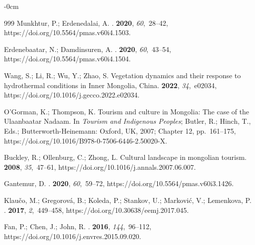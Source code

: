 \documentclass[geosciences,article,accept,pdftex,oneauthor]{Definitions/mdpi}
\begin{document}
\begin{adjustwidth}{-\extralength}{0cm}
\begin{thebibliography}{999}
Munkhtur, P.; Erdenedalai, A.
.
 {\bf 2020},
  {\em 60},~28--42, https://doi.org/10.5564/pmas.v60i4.1503.

Erdenebaatar, N.; Damdinsuren, A.
.
 {\bf 2020},
  {\em 60},~43--54, https://doi.org/10.5564/pmas.v60i4.1504.

Wang, S.; Li, R.; Wu, Y.; Zhao, S.
\newblock Vegetation dynamics and their response to hydrothermal conditions in
  Inner Mongolia, China.
 {\bf 2022}, {\em 34},~e02034, https://doi.org/10.1016/j.gecco.2022.e02034.

O'Gorman, K.; Thompson, K.
\newblock Tourism and culture in Mongolia: The case of the
  Ulaanbaatar Nadaam. In {\em Tourism and Indigenous Peoples}; Butler, R.;
  Hinch, T., Eds.; Butterworth-Heinemann: Oxford, UK, 2007; Chapter 12, pp.~161--175, https://doi.org/10.1016/B978-0-7506-6446-2.50020-X.

Buckley, R.; Ollenburg, C.; Zhong, L.
\newblock Cultural landscape in mongolian tourism.
 {\bf 2008}, {\em 35},~47--61, https://doi.org/10.1016/j.annals.2007.06.007.

Gantemur, D.
.
 {\bf 2020},
  {\em 60},~59--72, https://doi.org/10.5564/pmas.v60i3.1426.

Klaučo, M.; Gregorová, B.; Koleda, P.; Stankov, U.; Marković, V.; Lemenkova,
  P.
.
 {\bf 2017},
  {\em 2},~449--458, https://doi.org/10.30638/eemj.2017.045.

Fan, P.; Chen, J.; John, R.
.
 {\bf 2016}, {\em 144},~96--112, https://doi.org/10.1016/j.envres.2015.09.020. 


\end{thebibliography}
\end{adjustwidth}
\end{document}
